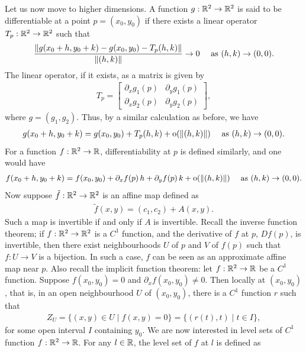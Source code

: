 Let us now move to higher dimensions. A function $g:\mathbb{R}^{2} \to \mathbb{R}^{2}$ is said to be differentiable at a point $p = (x_{0},y_{0})$ if there exists a linear operator $T_{p}:\mathbb{R}^{2} \to \mathbb{R}^{2}$ such that
\begin{align}
    \frac{\left\lVert g(x_{0}+h,y_{0}+k) - g(x_{0},y_{0}) - T_{p}(h,k)\right\rVert}{\left\lVert(h,k)\right\rVert} \to 0 \quad \text{ as } (h,k) \to (0,0).
\end{align}
The linear operator, if it exists, as a matrix is given by
\begin{align}
    T_{p} = \begin{bmatrix}
        \partial_{x} g_{1}(p) & \partial_{y} g_{1}(p) \\
        \partial_{x} g_{2}(p) & \partial_{y} g_{2}(p)
    \end{bmatrix},
\end{align}
where $g = (g_{1}, g_{2})$. Thus, by a similar calculation as before, we have
\begin{align}
    g(x_{0}+h,y_{0}+k) = g(x_{0},y_{0}) + T_{p}(h,k) + \operatorname{o}(\left\lVert(h,k)\right\rVert) \quad \text{ as } (h,k) \to (0,0).
\end{align}
For a function $f:\mathbb{R}^{2} \to \mathbb{R}$, differentiability at $p$ is defined similarly, and one would have
\begin{align}
    f(x_{0}+h,y_{0}+k) = f(x_{0},y_{0}) + \partial_{x} f(p) \, h + \partial_{y} f(p) \, k + \operatorname{o}(\left\lVert(h,k)\right\rVert) \quad \text{ as } (h,k) \to (0,0).
\end{align}
Now suppose $\tilde{f}:\mathbb{R}^{2} \to \mathbb{R}^{2}$ is an affine map defined as
\begin{align}
    \tilde{f}(x,y) = (c_{1},c_{2}) + A(x,y).
\end{align}
Such a map is invertible if and only if $A$ is invertible. Recall the inverse function theorem; if $f:\mathbb{R}^{2} \to \mathbb{R}^{2}$ is a $C^{1}$ function, and the derivative of $f$ at $p$, $Df(p)$, is invertible, then there exist neighbourhoods $U$ of $p$ and $V$ of $f(p)$ such that $f:U \to V$ is a bijection. In such a case, $f$ can be seen as an approximate affine map near $p$. Also recall the implicit function theorem: let $f:\mathbb{R}^{2} \to \mathbb{R}$ be a $C^{1}$ function. Suppose $f(x_{0},y_{0}) = 0$ and $\partial_{x} f(x_{0},y_{0}) \neq 0$. Then locally at $(x_{0},y_{0})$, that is, in an open neighbourhood $U$ of $(x_{0},y_{0})$, there is a $C^{1}$ function $r$ such that
\begin{align}
    Z_{U} = \{(x,y) \in U \mid f(x,y) = 0\} = \{(r(t), t) \mid t \in I\},
\end{align}
for some open interval $I$ containing $y_{0}$. We are now interested in level sets of $C^{1}$ function $f:\mathbb{R}^{2} \to \mathbb{R}$. For any $l \in \mathbb{R}$, the level set of $f$ at $l$ is defined as
